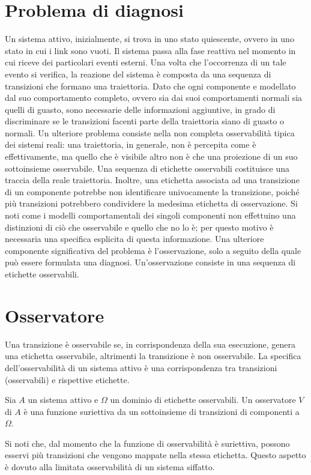 \section{Problema di diagnosi}
Un sistema attivo, inizialmente, si trova in uno stato quiescente, ovvero in uno stato in cui i link sono vuoti. Il sistema passa alla fase reattiva nel momento in cui riceve dei particolari eventi esterni. Una volta che l'occorrenza di un tale evento si verifica, la reazione del sistema è composta da una sequenza di transizioni che formano una traiettoria. Dato che ogni componente e modellato dal suo comportamento completo, ovvero sia dai suoi comportamenti normali sia quelli di guasto, sono necessarie delle informazioni aggiuntive, in grado di discriminare se le transizioni facenti parte della traiettoria siano di guasto o normali. Un ulteriore problema consiste nella non completa osservabilità tipica dei sistemi reali: una traiettoria, in generale, non è percepita come è effettivamente, ma quello che è visibile altro non è che una proiezione di un suo sottoinsieme osservabile. Una sequenza di etichette osservabili costituisce una traccia della reale traiettoria. Inoltre, una etichetta associata ad una transizione di un componente potrebbe non identificare univocamente la transizione, poiché più transizioni potrebbero condividere la medesima etichetta di osservazione. Si noti come i modelli comportamentali dei singoli componenti non effettuino una distinzioni di ciò che osservabile e quello che no lo è; per questo motivo è necessaria una specifica esplicita di questa informazione. Una ulteriore componente significativa del problema è l'osservazione, solo a seguito della quale può essere formulata una diagnosi. Un'osservazione consiste in una sequenza di etichette osservabili.

\section{Osservatore}
Una transizione è osservabile se, in corrispondenza della sua esecuzione, genera una etichetta osservabile, altrimenti la transizione è non osservabile. La specifica dell'osservabilità di un sistema attivo è una corrispondenza tra transizioni (osservabili) e rispettive etichette.
\begin{defn}
Sia $A$ un sistema attivo e $\Omega$ un dominio di etichette osservabili. Un osservatore $V$ di $A$ è una funzione suriettiva da un sottoinsieme di transizioni di componenti a $\Omega$.
\end{defn}
Si noti che, dal momento che la funzione di osservabilità è suriettiva, possono esservi più transizioni che vengono mappate nella stessa etichetta. Questo aspetto è dovuto alla limitata osservabilità di un sistema siffatto.

